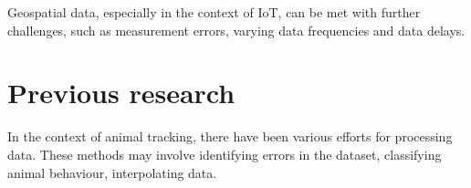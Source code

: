 Geospatial data, especially in the context of IoT, can be met with further challenges, such as measurement errors, varying data frequencies and data delays. 

\section{Previous research}

In the context of animal tracking, there have been various efforts for processing data. These methods may involve identifying errors in the dataset, classifying animal behaviour, interpolating data.


